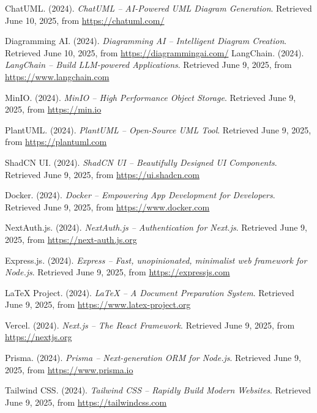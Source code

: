 \begin{thebibliography}{99}

    ChatUML. (2024). \textit{ChatUML – AI-Powered UML Diagram Generation}. Retrieved June 10, 2025, from \url{https://chatuml.com/}
    
    Diagramming AI. (2024). \textit{Diagramming AI – Intelligent Diagram Creation}. Retrieved June 10, 2025, from \url{https://diagrammingai.com/}
    LangChain. (2024). \textit{LangChain – Build LLM-powered Applications}. Retrieved June 9, 2025, from \url{https://www.langchain.com}

    MinIO. (2024). \textit{MinIO – High Performance Object Storage}. Retrieved June 9, 2025, from \url{https://min.io}

    PlantUML. (2024). \textit{PlantUML – Open-Source UML Tool}. Retrieved June 9, 2025, from \url{https://plantuml.com}

    ShadCN UI. (2024). \textit{ShadCN UI – Beautifully Designed UI Components}. Retrieved June 9, 2025, from \url{https://ui.shadcn.com}

    Docker. (2024). \textit{Docker – Empowering App Development for Developers}. Retrieved June 9, 2025, from \url{https://www.docker.com}

    NextAuth.js. (2024). \textit{NextAuth.js – Authentication for Next.js}. Retrieved June 9, 2025, from \url{https://next-auth.js.org}

    Express.js. (2024). \textit{Express – Fast, unopinionated, minimalist web framework for Node.js}. Retrieved June 9, 2025, from \url{https://expressjs.com}

    LaTeX Project. (2024). \textit{LaTeX – A Document Preparation System}. Retrieved June 9, 2025, from \url{https://www.latex-project.org}

    Vercel. (2024). \textit{Next.js – The React Framework}. Retrieved June 9, 2025, from \url{https://nextjs.org}

    Prisma. (2024). \textit{Prisma – Next-generation ORM for Node.js}. Retrieved June 9, 2025, from \url{https://www.prisma.io}

    Tailwind CSS. (2024). \textit{Tailwind CSS – Rapidly Build Modern Websites}. Retrieved June 9, 2025, from \url{https://tailwindcss.com}


\end{thebibliography}
